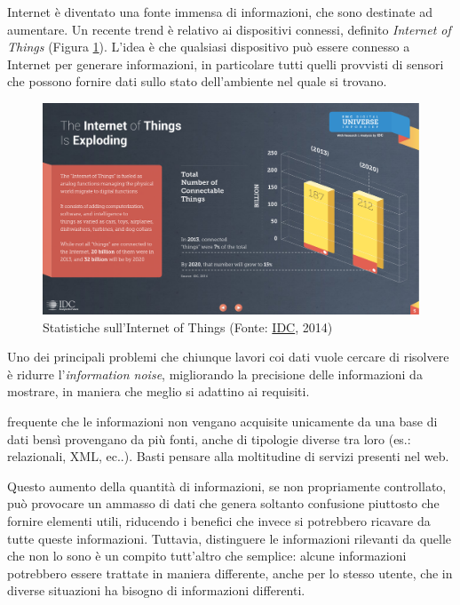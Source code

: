 Internet è diventato una fonte immensa di informazioni, che sono destinate ad aumentare. Un recente trend è relativo ai dispositivi connessi, definito \emph{Internet of Things} (Figura \ref{fig:statistiche-iot}). L'idea è che qualsiasi dispositivo può essere connesso a Internet per generare informazioni, in particolare tutti quelli provvisti di sensori che possono fornire dati sullo stato dell'ambiente nel quale si trovano.

\begin{figure}[ht]
	\centering
	\includegraphics[width=\textwidth]{1-introduzione/Immagini/iot-trend.pdf}
	\caption[Statistiche sull'Internet of Things]{Statistiche sull'Internet of Things (Fonte: \href{http://www.emc.com/leadership/digital-universe/2014iview/executive-summary.htm}{IDC}, 2014)\label{fig:statistiche-iot}}
\end{figure}

Uno dei principali problemi che chiunque lavori coi dati vuole cercare di risolvere è ridurre l'\emph{information noise}, migliorando la precisione delle informazioni da mostrare, in maniera che meglio si adattino ai requisiti.

\upe frequente che le informazioni non vengano acquisite unicamente da una base di dati bensì provengano da più fonti, anche di tipologie diverse tra loro (es.: relazionali, XML, ec..). Basti pensare alla moltitudine di servizi presenti nel web.

Questo aumento della quantità di informazioni, se non propriamente controllato, può provocare un ammasso di dati che genera soltanto confusione piuttosto che fornire elementi utili, riducendo i benefici che invece si potrebbero ricavare da tutte queste informazioni. Tuttavia, distinguere le informazioni rilevanti da quelle che non lo sono è un compito tutt'altro che semplice: alcune informazioni potrebbero essere trattate in maniera differente, anche per lo stesso utente, che in diverse situazioni ha bisogno di informazioni differenti. 

